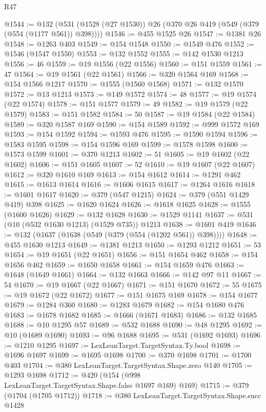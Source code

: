 \begin{lexlean}{R47}
\begin{coremodule}
@1544 := @132 (@531 (@1528 (@27 @1530)) @26 (@370 @26 @419 (@549 (@379 (@554 (@1177 @561)) @398))))
@1546 := @455 @1525 @26
@1547 := @1381 @26
@1548 := @1263 @403
@1549 := @154 @1548
@1550 := @1549 @476
@1552 := @1546 (@1547 @1550)
@1553 := @132 @1552
@1555 := @142 @1530 @1213
@1556 := 46
@1559 := @19 @1556 (@22 @1556)
@1560 := @151 @1559
@1561 := 47
@1564 := @19 @1561 (@22 @1561)
@1566 := @320 @1564 @169
@1568 := @154 @1566 @1217
@1570 := @1555 (@1560 @1568)
@1571 := @132 @1570
@1572 := @13 @1213
@1573 := @149 @1572
@1574 := 48
@1577 := @19 @1574 (@22 @1574)
@1578 := @151 @1577
@1579 := 49
@1582 := @19 @1579 (@22 @1579)
@1583 := @151 @1582
@1584 := 50
@1587 := @19 @1584 (@22 @1584)
@1589 := @320 @1587 @169
@1590 := @154 @1589
@1592 := @999 @1572 @169
@1593 := @154 @1592
@1594 := @1593 @476
@1595 := @1590 @1594
@1596 := @1583 @1595
@1598 := @154 @1596 @169
@1599 := @1578 @1598
@1600 := @1573 @1599
@1601 := @370 @1213
@1602 := 51
@1605 := @19 @1602 (@22 @1602)
@1606 := @151 @1605
@1607 := 52
@1610 := @19 @1607 (@22 @1607)
@1612 := @320 @1610 @169
@1613 := @154 @1612
@1614 := @1291 @462
@1615 := @1613 @1614
@1616 := @1606 @1615
@1617 := @1264 @1616
@1618 := @1601 @1617
@1620 := @379 (@547 @1215)
@1624 := @379 (@551 @1429 @419) @398
@1625 := @1620 @1624
@1626 := @1618 @1625
@1628 := @1555 (@1600 @1626)
@1629 := @132 @1628
@1630 := @1529 @1141
@1637 := @531 (@10 (@532 @1630 @1213) (@1529 @735)) @1213
@1638 := @1601 @419
@1646 := @132 (@1637 (@1638 (@549 (@379 (@554 (@1202 @561)) @398))))
@1648 := @455 @1630 @1213
@1649 := @1381 @1213
@1650 := @1293 @1212
@1651 := 53
@1654 := @19 @1651 (@22 @1651)
@1656 := @151 @1654 @462
@1658 := @154 @1656 @462
@1659 := @1650 @1658
@1661 := @154 @1659 @476
@1663 := @1648 (@1649 @1661)
@1664 := @132 @1663
@1666 := @142 @97 @11
@1667 := 54
@1670 := @19 @1667 (@22 @1667)
@1671 := @151 @1670
@1672 := 55
@1675 := @19 @1672 (@22 @1672)
@1677 := @151 @1675 @169
@1678 := @154 @1677
@1679 := @1284 @360
@1680 := @1283 @1679
@1682 := @154 @1680 @476
@1683 := @1678 @1682
@1685 := @1666 (@1671 @1683)
@1686 := @132 @1685
@1688 := @10 @1295 @57
@1689 := @532 @1688
@1690 := @48 @1295
@1692 := @10 (@1689 @1690)
@1693 := @96 @1688
@1695 := @531 (@1692 @1693)
@1696 := @1210 @1295
@1697 := LexLeanTarget.TargetSyntax.Ty.bool
@1698 := @1696 @1697
@1699 := @1695 @1698
@1700 := @370 @1698
@1701 := @1700 @403
@1704 := @380 LexLeanTarget.TargetSyntax.Shape.zero @140
@1705 := @1293 @1698
@1712 := @420 (@154 (@998 LexLeanTarget.TargetSyntax.Shape.false @1697 @169) @169)
@1715 := @379 (@1704 (@1705 @1712))
@1718 := @380 LexLeanTarget.TargetSyntax.Shape.succ @1428

\end{coremodule}
\end{lexlean}
